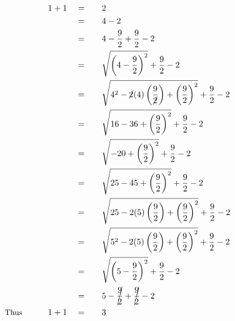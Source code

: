 \begin{alignat*}{5}
&\,&1+1\quad&=\quad&&2\\
&\,&\,&=\quad&&4-2\\
&\,&\,&=\quad&&4-\frac{9}{2}+\frac{9}{2}-2\\
&\,&\,&=\quad&&\sqrt{\left(4-\frac{9}{2}\right)^2}+\frac{9}{2}-2\\
&\,&\,&=\quad&&\sqrt{4^2-\cancel{2}(4)\left(\frac{9}{\cancel{2}}\right)+\left(\frac{9}{2}\right)^2}+\frac{9}{2}-2\\
&\,&\,&=\quad&&\sqrt{16-36+\left(\frac{9}{2}\right)^2}+\frac{9}{2}-2\\
&\,&\,&=\quad&&\sqrt{-20+\left(\frac{9}{2}\right)^2}+\frac{9}{2}-2\\
&\,&\,&=\quad&&\sqrt{25-45+\left(\frac{9}{2}\right)^2}+\frac{9}{2}-2\\
&\,&\,&=\quad&&\sqrt{25-2(5)\left(\frac{9}{2}\right)+\left(\frac{9}{2}\right)^2}+\frac{9}{2}-2\\
&\,&\,&=\quad&&\sqrt{5^2-2(5)\left(\frac{9}{2}\right)+\left(\frac{9}{2}\right)^2}+\frac{9}{2}-2\\
&\,&\,&=\quad&&\sqrt{\left(5-\frac{9}{2}\right)^2}+\frac{9}{2}-2\\
&\,&\,&=\quad&&5-\cancel{\frac{9}{2}}+\cancel{\frac{9}{2}}-2\\
&\small\text{Thus}\normalsize\qquad&1+1\quad&=\quad&&3
\end{alignat*}
